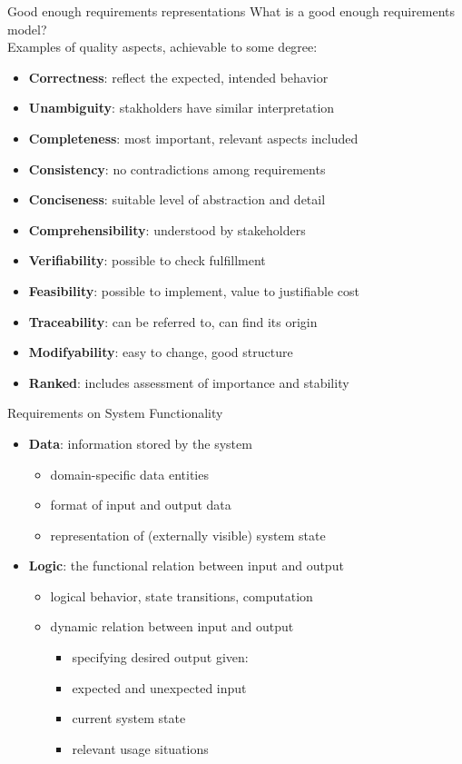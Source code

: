 \documentclass{beamer}
\begin{document}
\begin{frame}[fragile]{Good enough requirements representations}
What is a good enough requirements model?
\\ \vspace*{0.5em}Examples of quality aspects, achievable to some degree:
\begin{itemize}
\item \textbf{Correctness}: reflect the expected, intended behavior
\item \textbf{Unambiguity}: stakholders have similar interpretation
\item \textbf{Completeness}: most important, relevant aspects included
\item \textbf{Consistency}: no contradictions among requirements
\item \textbf{Conciseness}: suitable level of abstraction and detail 
\item \textbf{Comprehensibility}: understood by stakeholders 
\item \textbf{Verifiability}: possible to check fulfillment 
\item \textbf{Feasibility}: possible to implement, value to justifiable cost 
\item \textbf{Traceability}: can be referred to, can find its origin
\item \textbf{Modifyability}: easy to change, good structure
\item \textbf{Ranked}: includes assessment of importance and stability
\end{itemize}
\end{frame}

\begin{frame}[fragile]{Requirements on System Functionality}
\begin{itemize}
\item \textbf{Data}: information stored by the system 
\begin{itemize}
\item domain-specific data entities
\item format of input and output data
\item representation of (externally visible) system state
\end{itemize}

\item \textbf{Logic}: the functional relation between input and output 
\begin{itemize}
\item logical behavior, state transitions, computation
\item dynamic relation between input and output
\begin{itemize}
  \item specifying desired output given:
  \item expected and unexpected input
  \item current system state
  \item relevant usage situations
\end{itemize}
\end{itemize}

\end{itemize}
\end{frame}
\end{document}
